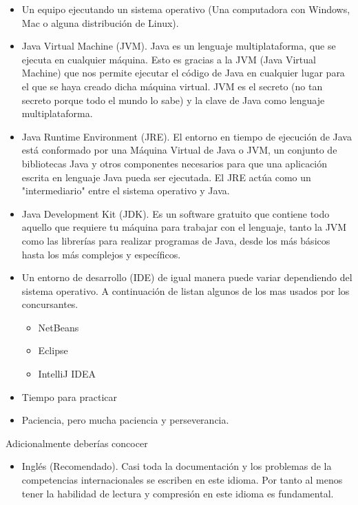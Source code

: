 \begin{itemize}
	\item Un equipo ejecutando un sistema operativo (Una computadora con Windows, Mac o alguna distribución de Linux).
	\item Java Virtual Machine (JVM). Java es un lenguaje multiplataforma, que se ejecuta en cualquier máquina. Esto es gracias a la JVM (Java Virtual Machine) que nos permite ejecutar el código de Java en cualquier lugar para el que se haya creado dicha máquina virtual. JVM es el secreto (no tan secreto porque todo el mundo lo sabe) y la clave de Java como lenguaje multiplataforma.
	\item Java Runtime Environment (JRE). El entorno en tiempo de ejecución de Java está conformado por una Máquina Virtual de Java o JVM, un conjunto de bibliotecas Java y otros componentes necesarios para que una aplicación escrita en lenguaje Java pueda ser ejecutada. El JRE actúa como un "intermediario" entre el sistema operativo y Java. 
	\item Java Development Kit (JDK). Es un software gratuito que contiene todo aquello que requiere tu máquina para trabajar con el lenguaje, tanto la JVM como las librerías para realizar programas de Java, desde los más básicos hasta los más complejos y específicos. 
	\item Un entorno de desarrollo (IDE) de igual manera puede variar dependiendo del sistema operativo. A continuación de listan algunos de los mas usados por los concursantes.
	\begin{itemize}
		\item NetBeans 
		\item Eclipse
		\item IntelliJ IDEA
	\end{itemize}
	\item Tiempo para practicar 
	\item Paciencia, pero mucha paciencia y perseverancia.
\end{itemize}

Adicionalmente deberías concocer

\begin{itemize}
	\item Inglés (Recomendado). Casi toda la documentación y los problemas de la competencias internacionales se escriben en este idioma. Por tanto al menos tener la habilidad de lectura y compresión en este idioma es fundamental.
	
\end{itemize}

